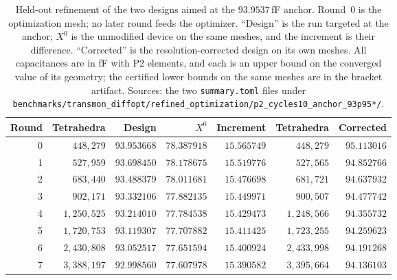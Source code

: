 \documentclass{anvil-paper}
\begin{document}
\begin{table}[t]
  \centering
  \caption{Held-out refinement of the two designs aimed at the
  $93.9537$\,fF anchor. Round~0 is the optimization mesh; no later round
  feeds the optimizer. ``Design'' is the run targeted at the anchor;
  $X^0$ is the unmodified device on the same meshes, and the increment is
  their difference. ``Corrected'' is the resolution-corrected design on
  its own meshes. All capacitances are in fF with P2 elements, and each
  is an upper bound on the converged value of its geometry; the
  certified lower bounds on the same meshes are in the bracket artifact.
  Sources: the two \texttt{summary.toml} files under
  \texttt{benchmarks/transmon\_diffopt/refined\_optimization/p2\_cycles10\_anchor\_93p95*/}.}
  \label{tab:heldout}
  \footnotesize
  \setlength{\tabcolsep}{4pt}
  \begin{tabular}{@{}rrrrrrr@{}}
    \toprule
    Round & Tetrahedra & Design & $X^0$ & Increment & Tetrahedra & Corrected \\
    \midrule
    0 & $448{,}279$ & $93.953668$ & $78.387918$ & $15.565749$ & $448{,}279$ & $95.113016$ \\
    1 & $527{,}959$ & $93.698450$ & $78.178675$ & $15.519776$ & $527{,}565$ & $94.852766$ \\
    2 & $683{,}440$ & $93.488379$ & $78.011681$ & $15.476698$ & $681{,}721$ & $94.637932$ \\
    3 & $902{,}171$ & $93.332106$ & $77.882135$ & $15.449971$ & $900{,}507$ & $94.477742$ \\
    4 & $1{,}250{,}525$ & $93.214010$ & $77.784538$ & $15.429473$ & $1{,}248{,}566$ & $94.355732$ \\
    5 & $1{,}720{,}753$ & $93.119307$ & $77.707882$ & $15.411425$ & $1{,}723{,}255$ & $94.259623$ \\
    6 & $2{,}430{,}808$ & $93.052517$ & $77.651594$ & $15.400924$ & $2{,}433{,}998$ & $94.191268$ \\
    7 & $3{,}388{,}197$ & $92.998560$ & $77.607978$ & $15.390582$ & $3{,}395{,}664$ & $94.136103$ \\
    \bottomrule
  \end{tabular}
\end{table}
\end{document}
